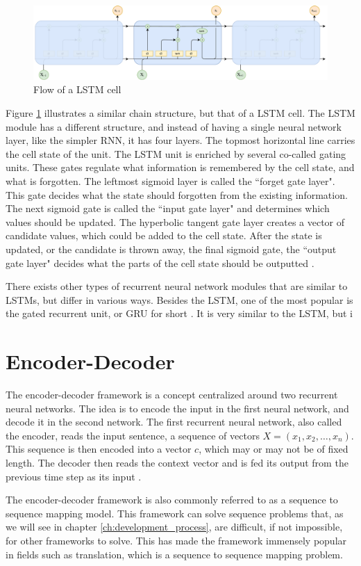 \begin{figure}[ht]
    \centering
    \includegraphics[width=1\textwidth]{fig/related_work/lstm_flow.pdf}
    \caption{Flow of a LSTM cell}
    \label{fig:nn-lstm-flow}
\end{figure}

Figure \ref{fig:nn-lstm-flow} illustrates a similar chain structure, but that of a LSTM cell. The LSTM module has a different structure, and instead of having a single neural network layer, like the simpler RNN, it has four layers. The topmost horizontal line carries the cell state of the unit. The LSTM unit is enriched by several co-called gating units. These gates regulate what information is remembered by the cell state, and what is forgotten. The leftmost sigmoid layer is called the ``forget gate layer". This gate decides what the state should forgotten from the existing information. The next sigmoid gate is called the ``input gate layer" and determines which values should be updated. The hyperbolic tangent gate layer creates a vector of candidate values, which could be added to the cell state. After the state is updated, or the candidate is thrown away, the final sigmoid gate, the ``output gate layer" decides what the parts of the cell state should be outputted \citep{hochreiter1997long, goodfellow2016deeplearning, olah2015lstm, gers2002learning}.

There exists other types of recurrent neural network modules that are similar to LSTMs, but differ in various ways. Besides the LSTM, one of the most popular is the gated recurrent unit, or GRU for short \citep{chung2014empirical}. It is very similar to the LSTM, but i


\section{Encoder-Decoder}
\label{sec:encoder-decoder}
The encoder-decoder framework is a concept centralized around two recurrent neural networks. The idea is to encode the input in the first neural network, and decode it in the second network. The first recurrent neural network, also called the encoder, reads the input sentence, a sequence of vectors \(X = (x_{1}, x_{2}, \ldots, x_{n})\). This sequence is then encoded into a vector \(c\), which may or may not be of fixed length. The decoder then reads the context vector and is fed its output from the previous time step as its input \citep{sutskever2014sequence}.

The encoder-decoder framework is also commonly referred to as a sequence to sequence mapping model. This framework can solve sequence problems that, as we will see in chapter \ref{ch:development_process}, are difficult, if not impossible, for other frameworks to solve. This has made the framework immensely popular in fields such as translation, which is a sequence to sequence mapping problem.